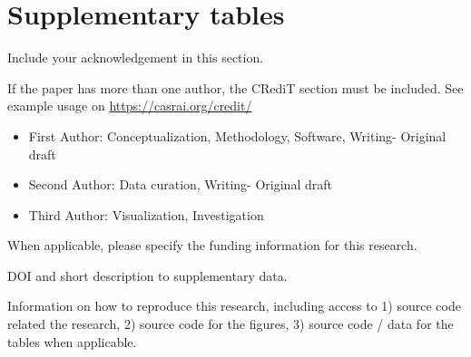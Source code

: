 \documentclass[
  manuscript=article,  %
  layout=preprint,  %
  year=20xx,
  volume=x,
]{extra/joas}
\begin{document}
\section{Supplementary tables}
\blindtext


\begin{acknowledgement}
  Include your acknowledgement in this section.
\end{acknowledgement}

\begin{credit}
  If the paper has more than one author, the CRediT section must be included. See example usage on \url{https://casrai.org/credit/}

  \begin{itemize}
    \item First Author: Conceptualization, Methodology, Software, Writing- Original draft
    \item Second Author: Data curation, Writing- Original draft
    \item Third Author: Visualization, Investigation
  \end{itemize}
\end{credit}


\begin{funding}
  When applicable, please specify the funding information for this research.
\end{funding}


\begin{opendata}
  DOI and short description to supplementary data.
\end{opendata}

\begin{reproduce}
Information on how to reproduce this research, including access to 1) source code related the research, 2) source code for the figures, 3) source code / data for the tables when applicable.
\end{reproduce}



\printbibliography
\end{document}
